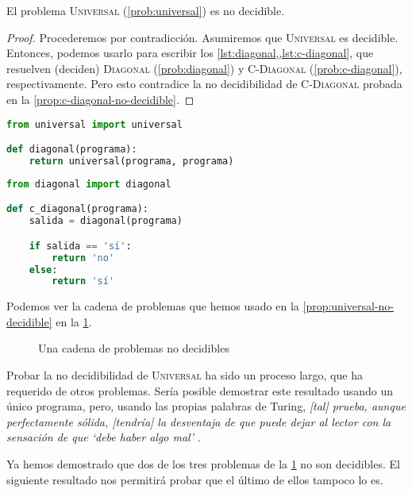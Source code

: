 \begin{proposicion}\label{prop:universal-no-decidible}
El problema \textsc{Universal} (\cref{prob:universal}) es no decidible.
\end{proposicion}
\begin{proof}
Procederemos por contradicción. Asumiremos que \textsc{Universal} es decidible. Entonces, podemos usarlo para escribir los \cref{lst:diagonal,,lst:c-diagonal}, que resuelven (deciden) \textsc{Diagonal} (\cref{prob:diagonal}) y \textsc{C-Diagonal} (\cref{prob:c-diagonal}), respectivamente. Pero esto contradice la no decidibilidad de \textsc{C-Diagonal} probada en la \cref{prop:c-diagonal-no-decidible}.
\end{proof}
\vspace{8pt}
\begin{lstlisting}[language=Python, caption=\lstinline{diagonal.py},label={lst:diagonal}]
from universal import universal

def diagonal(programa):
    return universal(programa, programa)
\end{lstlisting}
\begin{lstlisting}[language=Python, caption=\lstinline{c_diagonal.py},label={lst:c-diagonal}]
from diagonal import diagonal

def c_diagonal(programa):
    salida = diagonal(programa)

    if salida == 'sí':
        return 'no'
    else:
        return 'sí'
\end{lstlisting}
Podemos ver la cadena de problemas que hemos usado en la \cref{prop:universal-no-decidible} en la \cref{fig:cadena-problemas}.
\begin{figure}[H]
\centering

\caption{Una cadena de problemas no decidibles}
\label{fig:cadena-problemas}
\end{figure}
Probar la no decidibilidad de \textsc{Universal} ha sido un proceso largo, que ha requerido de otros problemas. Sería posible demostrar este resultado usando un único programa, pero, usando las propias palabras de Turing, \emph{\guillemotleft{}[tal] prueba, aunque perfectamente sólida, [tendría] la desventaja de que puede dejar al lector con la sensación de que `debe haber algo mal'\guillemotright{}} \cite{Turing1937}.

Ya hemos demostrado que dos de los tres problemas de la \cref{fig:cadena-problemas} no son decidibles. El siguiente resultado nos permitirá probar que el último de ellos tampoco lo es.

